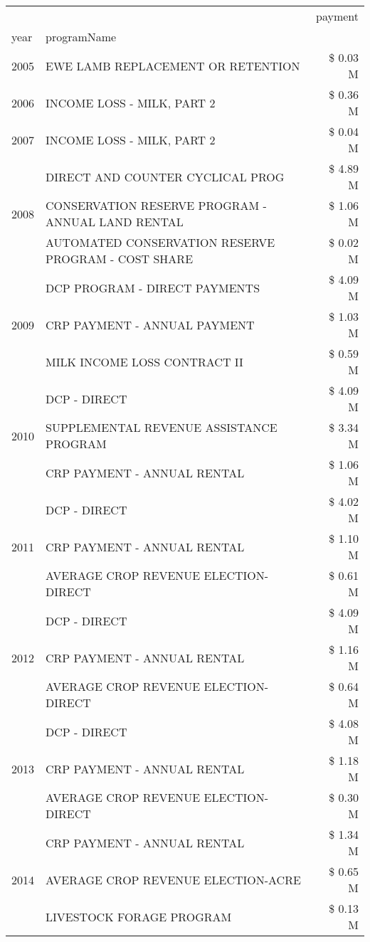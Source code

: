 \begin{tabular}{llr}
\toprule
 &  & payment \\
year & programName &  \\
\midrule
2005 & EWE LAMB REPLACEMENT OR RETENTION & \$ 0.03 M \\
\cline{1-3}
2006 & INCOME LOSS - MILK, PART 2 & \$ 0.36 M \\
\cline{1-3}
2007 & INCOME LOSS - MILK, PART 2 & \$ 0.04 M \\
\cline{1-3}
\multirow[t]{3}{*}{2008} & DIRECT AND COUNTER CYCLICAL PROG & \$ 4.89 M \\
 & CONSERVATION RESERVE PROGRAM - ANNUAL LAND RENTAL & \$ 1.06 M \\
 & AUTOMATED CONSERVATION RESERVE PROGRAM - COST SHARE & \$ 0.02 M \\
\cline{1-3}
\multirow[t]{3}{*}{2009} & DCP PROGRAM - DIRECT PAYMENTS & \$ 4.09 M \\
 & CRP PAYMENT - ANNUAL PAYMENT & \$ 1.03 M \\
 & MILK INCOME LOSS CONTRACT II & \$ 0.59 M \\
\cline{1-3}
\multirow[t]{3}{*}{2010} & DCP - DIRECT & \$ 4.09 M \\
 & SUPPLEMENTAL REVENUE ASSISTANCE PROGRAM & \$ 3.34 M \\
 & CRP PAYMENT - ANNUAL RENTAL & \$ 1.06 M \\
\cline{1-3}
\multirow[t]{3}{*}{2011} & DCP - DIRECT & \$ 4.02 M \\
 & CRP PAYMENT - ANNUAL RENTAL & \$ 1.10 M \\
 & AVERAGE CROP REVENUE ELECTION-DIRECT & \$ 0.61 M \\
\cline{1-3}
\multirow[t]{3}{*}{2012} & DCP - DIRECT & \$ 4.09 M \\
 & CRP PAYMENT - ANNUAL RENTAL & \$ 1.16 M \\
 & AVERAGE CROP REVENUE ELECTION-DIRECT & \$ 0.64 M \\
\cline{1-3}
\multirow[t]{3}{*}{2013} & DCP - DIRECT & \$ 4.08 M \\
 & CRP PAYMENT - ANNUAL RENTAL & \$ 1.18 M \\
 & AVERAGE CROP REVENUE ELECTION-DIRECT & \$ 0.30 M \\
\cline{1-3}
\multirow[t]{3}{*}{2014} & CRP PAYMENT - ANNUAL RENTAL & \$ 1.34 M \\
 & AVERAGE CROP REVENUE ELECTION-ACRE & \$ 0.65 M \\
 & LIVESTOCK FORAGE PROGRAM & \$ 0.13 M \\
\cline{1-3}

\end{tabular}
